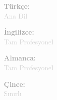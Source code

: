 \documentclass[10pt,a4paper]{article}
\begin{document}
\vspace{1pt}
\noindent
\begin{minipage}[t]{0.24\textwidth}
  \textcolor{darkgray}{\textbf{Türkçe:}} \\
  \textcolor{lightgray}{\small Ana Dil}
\end{minipage}%
\hfill
\begin{minipage}[t]{0.24\textwidth}
  \textcolor{darkgray}{\textbf{İngilizce:}} \\
  \textcolor{lightgray}{\small Tam Profesyonel}
\end{minipage}%
\hfill
\begin{minipage}[t]{0.24\textwidth}
  \textcolor{darkgray}{\textbf{Almanca:}} \\
  \textcolor{lightgray}{\small Tam Profesyonel}
\end{minipage}%
\hfill
\begin{minipage}[t]{0.24\textwidth}
  \textcolor{darkgray}{\textbf{Çince:}} \\
  \textcolor{lightgray}{\small Sınırlı}
\end{minipage}
\end{document}

